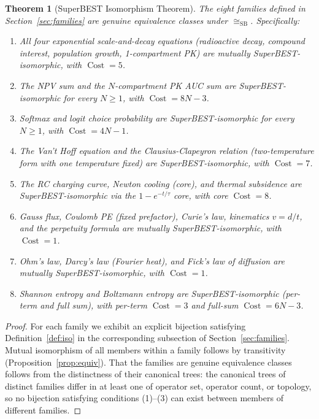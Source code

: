 \documentclass[12pt,a4paper]{article}
\newtheorem{theorem}{Theorem}[section]
\theoremstyle{definition}
\newcommand{\Cost}{\operatorname{Cost}}
\newcommand{\siso}{\cong_{\mathrm{SB}}}
\begin{document}
\begin{theorem}[SuperBEST Isomorphism Theorem]
\label{thm:main}
The eight families defined in Section~\ref{sec:families} are genuine
equivalence classes under $\siso$.  Specifically:
\begin{enumerate}
  \item[(F1)] All four exponential scale-and-decay equations (radioactive decay,
        compound interest, population growth, 1-compartment PK) are mutually
        SuperBEST-isomorphic, with $\Cost = 5$.
  \item[(F2)] The NPV sum and the $N$-compartment PK AUC sum are
        SuperBEST-isomorphic for every $N \geq 1$, with $\Cost = 8N - 3$.
  \item[(F3)] Softmax and logit choice probability are SuperBEST-isomorphic
        for every $N \geq 1$, with $\Cost = 4N - 1$.
  \item[(F4)] The Van't Hoff equation and the Clausius-Clapeyron relation
        (two-temperature form with one temperature fixed) are SuperBEST-isomorphic,
        with $\Cost = 7$.
  \item[(F5)] The RC charging curve, Newton cooling (core), and thermal
        subsidence are SuperBEST-isomorphic via the $1 - e^{-t/\tau}$ core,
        with core $\Cost = 8$.
  \item[(F6)] Gauss flux, Coulomb PE (fixed prefactor), Curie's law,
        kinematics $v = d/t$, and the perpetuity formula are mutually
        SuperBEST-isomorphic, with $\Cost = 1$.
  \item[(F7)] Ohm's law, Darcy's law (Fourier heat), and Fick's law of
        diffusion are mutually SuperBEST-isomorphic, with $\Cost = 1$.
  \item[(F8)] Shannon entropy and Boltzmann entropy are SuperBEST-isomorphic
        (per-term and full sum), with per-term $\Cost = 3$ and full-sum
        $\Cost = 6N - 3$.
\end{enumerate}
\end{theorem}

\begin{proof}
For each family we exhibit an explicit bijection satisfying
Definition~\ref{def:iso} in the corresponding subsection of
Section~\ref{sec:families}.  Mutual isomorphism of all members within a family
follows by transitivity (Proposition~\ref{prop:equiv}).  That the families are
genuine equivalence classes follows from the distinctness of their canonical
trees: the canonical trees of distinct families differ in at least one of
operator set, operator count, or topology, so no bijection satisfying conditions
(1)--(3) can exist between members of different families.
\end{proof}
\end{document}
